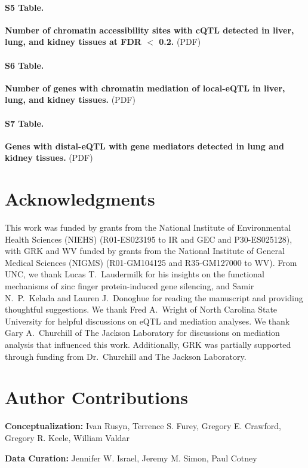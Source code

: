 \documentclass[10pt,letterpaper]{article}
\begin{document}
\paragraph*{S5 Table.}
\label{S_cqtl_lenient}
{\bf Number of chromatin accessibility sites with cQTL detected in liver, lung, and kidney tissues at FDR $<$ 0.2.} 
(PDF)

\paragraph*{S6 Table.}
\label{S_mediation}
{\bf Number of genes with chromatin mediation of local-eQTL in liver, lung, and kidney tissues.} 
(PDF)

\paragraph*{S7 Table.}
\label{S_exmediation}
{\bf Genes with distal-eQTL with gene mediators detected in lung and kidney tissues.} 
(PDF)


\section*{Acknowledgments}
This work was funded by grants from the National Institute of Environmental Health Sciences (NIEHS) (R01-ES023195 to IR and GEC and P30-ES025128), with GRK and WV funded by grants from the National Institute of General Medical Sciences (NIGMS) (R01-GM104125 and R35-GM127000 to WV). From UNC, we thank Lucas T.\ Laudermilk for his insights on the functional mechanisms of zinc finger protein-induced gene silencing, and Samir N.\ P.\ Kelada and Lauren J.\ Donoghue for reading the manuscript and providing thoughtful suggestions. We thank Fred A.\ Wright of North Carolina State University for helpful discussions on eQTL and mediation analyses. We thank Gary A.\ Churchill of The Jackson Laboratory for discussions on mediation analysis that influenced this work. Additionally, GRK was partially supported through funding from Dr.\ Churchill and The Jackson Laboratory.

\section*{Author Contributions}

\noindent \textbf{Conceptualization:} Ivan Rusyn, Terrence S. Furey, Gregory E. Crawford, Gregory R. Keele, William Valdar

\noindent \textbf{Data Curation:} Jennifer W. Israel, Jeremy M. Simon, Paul Cotney
\end{document}
